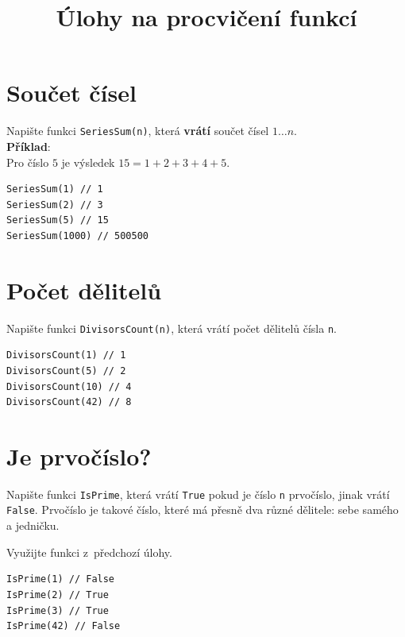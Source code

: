 \documentclass[12pt,a4paper]{article}
\begin{document}
\pagestyle{empty}
\title{Úlohy na procvičení funkcí}
\date{\vspace{-10ex}}
\setlength{\droptitle}{-6em}
\maketitle

\setlength\parindent{0pt}

\begin{multicols}{2}

\section{Součet čísel}

Napište funkci \texttt{SeriesSum(n)}, která \textbf{vrátí} součet čísel
$1 \ldots n$.\\

\textbf{Příklad}:\\
Pro číslo $5$ je výsledek $15 = 1 + 2 + 3 + 4 + 5$.

\begin{verbatim}
SeriesSum(1) // 1
SeriesSum(2) // 3
SeriesSum(5) // 15
SeriesSum(1000) // 500500
\end{verbatim}

\section{Počet dělitelů}

Napište funkci \texttt{DivisorsCount(n)}, která vrátí počet dělitelů čísla
\texttt{n}.

\begin{verbatim}
DivisorsCount(1) // 1
DivisorsCount(5) // 2
DivisorsCount(10) // 4
DivisorsCount(42) // 8
\end{verbatim}

\section{Je prvočíslo?}

Napište funkci \texttt{IsPrime}, která vrátí \texttt{True} pokud je číslo
\texttt{n} prvočíslo, jinak vrátí \texttt{False}. Prvočíslo je takové číslo,
které má přesně dva různé dělitele: sebe samého a jedničku.

Využijte funkci z~předchozí úlohy.

\begin{verbatim}
IsPrime(1) // False
IsPrime(2) // True
IsPrime(3) // True
IsPrime(42) // False
\end{verbatim}


\end{multicols}
\end{document}

